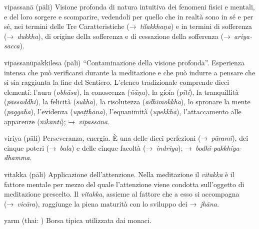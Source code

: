 \begin{glossarydescription}
\item[vipassanā] (pāli) Visione profonda di natura intuitiva dei fenomeni fisici
  e mentali, e del loro sorgere e scomparire, vedendoli per quello che in realtà
  sono in sé e per sé, nei termini delle Tre Caratteristiche
  (→~\emph{tilakkhaṇa}) e in termini di sofferenza (→~\emph{dukkha}), di origine
  della sofferenza e di cessazione della sofferenza (→~\emph{ariya-sacca}).

\item[vipassanūpakkilesa] (pāli) ``Contaminazione della visione profonda''.
  Esperienza intensa che può verificarsi durante la meditazione e che può
  indurre a pensare che si sia raggiunta la fine del Sentiero. L'elenco
  tradizionale comprende dieci elementi: l'aura (\emph{obhāsa}), la conoscenza
  (\emph{ñāṇa}), la gioia (\emph{pīti}), la tranquillità (\emph{passaddhi}), la
  felicità (\emph{sukha}), la risolutezza (\emph{adhimokkha}), lo spronare la
  mente (\emph{paggaha}), l'evidenza (\emph{upaṭṭhāna}), l'equanimità
  (\emph{upekkhā}), l'attaccamento alle apparenze (\emph{nikanti});
  →~\emph{vipassanā}.

\item[viriya] (pāli) Perseveranza, energia. È una delle dieci perfezioni
  (→~\emph{pāramī}), dei cinque poteri (→~\emph{bala}) e delle cinque facoltà
  (→~\emph{indriya}); →~\emph{bodhi-pakkhiya-dhamma}.

\item[vitakka] (pāli) Applicazione dell'attenzione. Nella meditazione il
  \emph{vitakka} è il fattore mentale per mezzo del quale l'attenzione viene
  condotta sull'oggetto di meditazione prescelto. Il \emph{vitakka}, assieme al
  fattore che a esso si accompagna (→~\emph{vicāra}), raggiunge la piena
  maturità con lo sviluppo dei →~\emph{jhāna}.



\item[yarm] (thai: ) Borsa tipica utilizzata dai monaci.

\end{glossarydescription}

